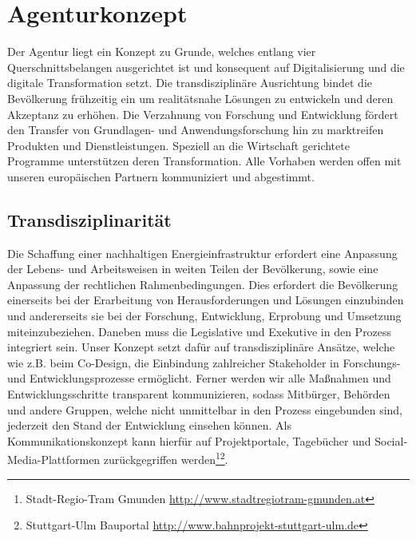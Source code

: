 \section{Agenturkonzept}

Der Agentur liegt ein Konzept zu Grunde, welches entlang vier Querschnittsbelangen ausgerichtet ist und konsequent auf Digitalisierung und die digitale Transformation setzt.
Die transdisziplinäre Ausrichtung bindet die Bevölkerung frühzeitig ein um realitätsnahe Lösungen zu entwickeln und deren Akzeptanz zu erhöhen.
Die Verzahnung von Forschung und Entwicklung fördert den Transfer von Grundlagen- und Anwendungsforschung hin zu marktreifen Produkten und Dienstleistungen.
Speziell an die Wirtschaft gerichtete Programme unterstützen deren Transformation.
Alle Vorhaben werden offen mit unseren europäischen Partnern kommuniziert und abgestimmt.

\subsection{Transdisziplinarität}

Die Schaffung einer nachhaltigen Energieinfrastruktur erfordert eine Anpassung der Lebens- und Arbeitsweisen in weiten Teilen der Bevölkerung, sowie eine Anpassung der rechtlichen Rahmenbedingungen.
Dies erfordert die Bevölkerung einerseits bei der Erarbeitung von Herausforderungen und Lösungen einzubinden und andererseits sie bei der Forschung, Entwicklung, Erprobung und Umsetzung miteinzubeziehen.
Daneben muss die Legislative und Exekutive in den Prozess integriert sein.
Unser Konzept setzt dafür auf transdisziplinäre Ansätze, welche wie z.B. beim Co-Design, die Einbindung zahlreicher Stakeholder in Forschungs- und Entwicklungsprozesse ermöglicht.
Ferner werden wir alle Maßnahmen und Entwicklungsschritte transparent kommunizieren, sodass Mitbürger, Behörden und andere Gruppen, welche nicht unmittelbar in den Prozess eingebunden sind, jederzeit den Stand der Entwicklung einsehen können.
Als Kommunikationskonzept kann hierfür auf Projektportale, Tagebücher und Social-Media-Plattformen zurückgegriffen werden\footnote{Stadt-Regio-Tram Gmunden \url{http://www.stadtregiotram-gmunden.at}}\footnote{Stuttgart-Ulm Bauportal \url{http://www.bahnprojekt-stuttgart-ulm.de}}.


